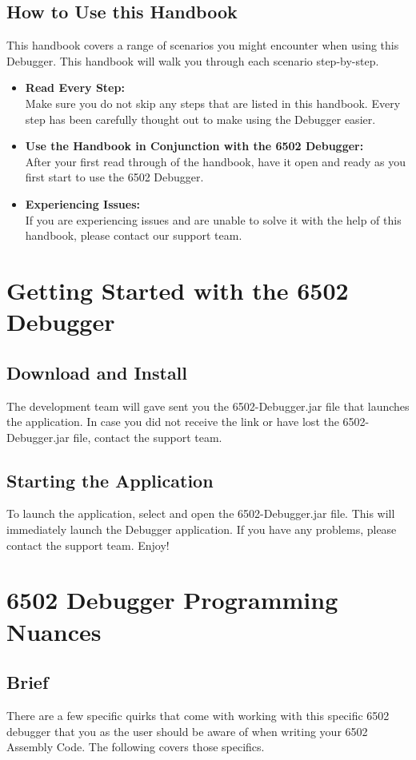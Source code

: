 \documentclass[a3paper, 11pt]{article}
\begin{document}
\subsection{How to Use this Handbook}
This handbook covers a range of scenarios you might encounter when using this Debugger. This handbook will walk you through each scenario step-by-step.
\begin{itemize}
	\item \textbf{Read Every Step:}\\
	Make sure you do not skip any steps that are listed in this handbook. Every step has been carefully thought out to make using the Debugger easier. 
	\item \textbf{Use the Handbook in Conjunction with the 6502 Debugger:}\\
	After your first read through of the handbook, have it open and ready as you first start to use the 6502 Debugger. 
	\item \textbf{Experiencing Issues:}\\
	If you are experiencing issues and are unable to solve it with the help of this handbook, please contact our support team. 
\end{itemize}
\pagebreak

\section{Getting Started with the 6502 Debugger}
\subsection{Download and Install}
The development team will gave sent you the 6502-Debugger.jar file that launches the application. In case you did not receive the link or have lost the 6502-Debugger.jar file, contact the support team. 
\subsection{Starting the Application}
To launch the application, select and open the 6502-Debugger.jar file. This will immediately launch the Debugger application. If you have any problems, please contact the support team. Enjoy!
\pagebreak

\section{6502 Debugger Programming Nuances}
\subsection{Brief}
There are a few specific quirks that come with working with this specific 6502 debugger that you as the user should be aware of when writing your 6502 Assembly Code. The following covers those specifics.
\end{document}
